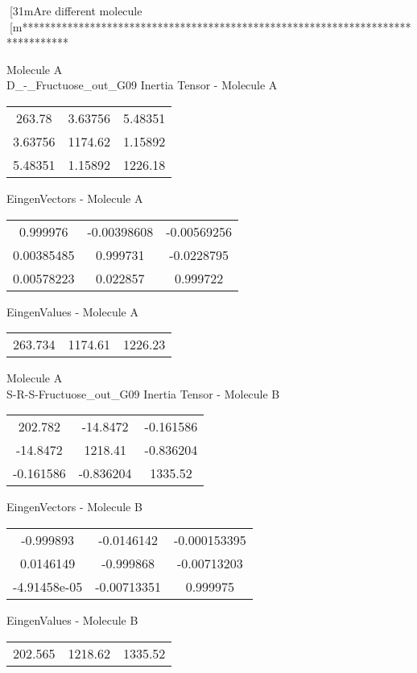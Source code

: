 [31mAre different molecule
[m********************************************************************************
\newpage
\begin{multicols}{2}
\begin{center}
Molecule A \\ 
D_-_Fructuose_out_G09
Inertia Tensor - Molecule A \\
\vtab
\begin{tabular}{|c c c|}
263.78	 & 	3.63756	 & 	5.48351	 \\
3.63756	 & 	1174.62	 & 	1.15892	 \\
5.48351	 & 	1.15892	 & 	1226.18
\end{tabular}

\vtab
 EingenVectors - Molecule A     \\
\vtab
\begin{tabular}{|c c c|}
0.999976	 & 	-0.00398608	 & 	-0.00569256	 \\
0.00385485	 & 	0.999731	 & 	-0.0228795	 \\
0.00578223	 & 	0.022857	 & 	0.999722
\end{tabular}

\vtab
 EingenValues - Molecule A     \\
\vtab
\begin{tabular}{|c c c|}
263.734	 & 	1174.61	 & 	1226.23
\end{tabular}
\columnbreak
Molecule A \\ 
S-R-S-Fructuose_out_G09
Inertia Tensor - Molecule B \\
\vtab
\begin{tabular}{|c c c|}
202.782	 & 	-14.8472	 & 	-0.161586	 \\
-14.8472	 & 	1218.41	 & 	-0.836204	 \\
-0.161586	 & 	-0.836204	 & 	1335.52
\end{tabular}

\vtab
 EingenVectors - Molecule B     \\
\vtab
\begin{tabular}{|c c c|}
-0.999893	 & 	-0.0146142	 & 	-0.000153395	 \\
0.0146149	 & 	-0.999868	 & 	-0.00713203	 \\
-4.91458e-05	 & 	-0.00713351	 & 	0.999975
\end{tabular}

\vtab
 EingenValues - Molecule B     \\
\vtab
\begin{tabular}{|c c c|}
202.565	 & 	1218.62	 & 	1335.52
\end{tabular}
\end{center}
\end{multicols}
